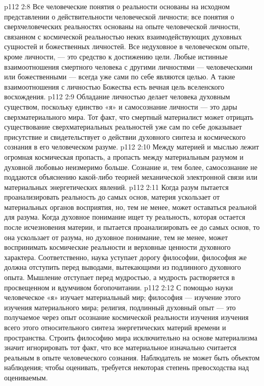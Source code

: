 \vs p112 2:8 Все человеческие понятия о реальности основаны на исходном представлении о действительности человеческой личности; все понятия о сверхчеловеческих реальностях основаны на опыте человеческой личности, связанном с космической реальностью неких взаимодействующих духовных сущностей и божественных личностей. Все недуховное в человеческом опыте, кроме личности, --- это средство к достижению цели. Любые истинные взаимоотношения смертного человека с другими личностями --- человеческими или божественными --- всегда уже сами по себе являются целью. А такие взаимоотношения с личностью Божества есть вечная цель вселенского восхождения.
\vs p112 2:9 Обладание личностью делает человека духовным существом, поскольку единство «я» и самосознание личности --- это дары сверхматериального мира. Тот факт, что смертный материалист может отрицать существование сверхматериальных реальностей уже сам по себе доказывает присутствие и свидетельствует о действии духовного синтеза и космического сознания в его человеческом разуме.
\vs p112 2:10 Между материей и мыслью лежит огромная космическая пропасть, а пропасть между материальным разумом и духовной любовью неизмеримо больше. Сознание и, тем более, самосознание не поддаются объяснению какой\hyp{}либо теорией механической электронной связи или материальных энергетических явлений.
\vs p112 2:11 \pc Когда разум пытается проанализировать реальность до самых основ, материя ускользает от материальных органов восприятия, но, тем не менее, может оставаться реальной для разума. Когда духовное понимание ищет ту реальность, которая остается после исчезновения материи, и пытается проанализировать ее до самых основ, то она ускользает от разума, но духовное понимание, тем не менее, может воспринимать космические реальности и верховные ценности духовного характера. Соответственно, наука уступает дорогу философии, философия же должна отступить перед выводами, вытекающими из подлинного духовного опыта. Мышление отступает перед мудростью, а мудрость растворяется в просвещенном и вдумчивом богопочитании.
\vs p112 2:12 С помощью науки человеческое «я» изучает материальный мир; философия --- изучение этого изучения материального мира; религия, подлинный духовный опыт --- это получаемое через опыт осознание космической реальности изучения изучения всего этого относительного синтеза энергетических материй времени и пространства. Строить философию мира исключительно на основе материализма значит игнорировать тот факт, что все материальное изначально считается реальным в опыте человеческого сознания. Наблюдатель не может быть объектом наблюдения; чтобы оценивать, требуется некоторая степень превосходства над оцениваемым.
